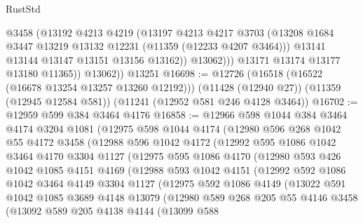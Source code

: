 \begin{lexlean}{RustStd}
\begin{coremodule}
{{{{{{{{{{{{{{{{{{{                  @3458
                  (@13192
                    @4213
                    @4219
                    (@13197
                      @4213
                      @4217
                      @3703
                      (@13208 @1684 @3447 @13219 @13132 @12231 (@11359 (@12233 @4207 @3464)))
                      @13141
                      @13144
                      @13147
                      @13151
                      @13156
                      @13162))
                  @13062)))
            @13171
            @13174
            @13177
            @13180
            @11365))
        @13062))
    @13251
@16698 := @12726
    (@16518 (@16522 (@16678 @13254 @13257 @13260 @12192)))
    (@11428 (@12940 @27))
    (@11359 (@12945 @12584 @581))
    (@11241 (@12952 @581 @246 @4128 @3464))
@16702 := @12959 @599 @384 @3464 @4176
@16858 := @12966
    @598
    @1044
    @384
    @3464
    @4174
    @3204
    @1081
    (@12975
      @598
      @1044
      @4174
      (@12980
        @596
        @268
        @1042
        @55
        @4172
        @3458
        (@12988
          @596
          @1042
          @4172
          (@12992
            @595
            @1086
            @1042
            @3464
            @4170
            @3304
            @1127
            (@12975
              @595
              @1086
              @4170
              (@12980
                @593
                @426
                @1042
                @1085
                @4151
                @4169
                (@12988
                  @593
                  @1042
                  @4151
                  (@12992
                    @592
                    @1086
                    @1042
                    @3464
                    @4149
                    @3304
                    @1127
                    (@12975
                      @592
                      @1086
                      @4149
                      (@13022
                        @591
                        @1042
                        @1085
                        @3689
                        @4148
                        @13079
                        (@12980
                          @589
                          @268
                          @205
                          @55
                          @4146
                          @3458
                          (@13092
                            @589
                            @205
                            @4138
                            @4144
                            (@13099
                              @588
}}}}}}}}}}}}}}}}}}}
\end{coremodule}
\end{lexlean}
